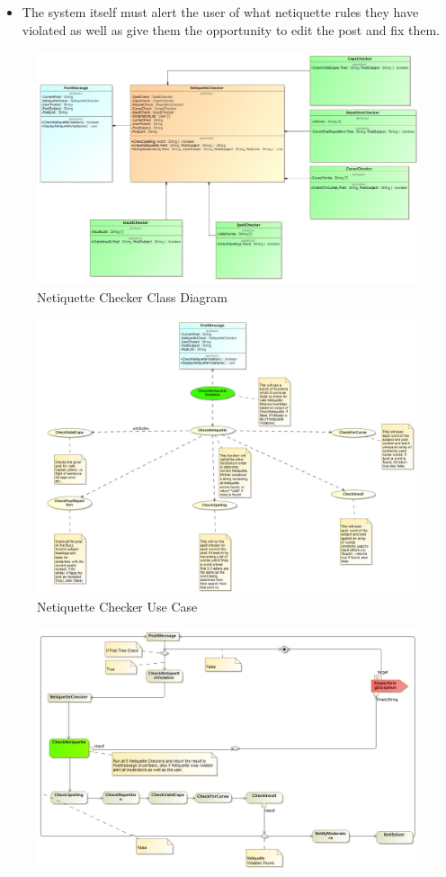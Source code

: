 \documentclass[11pt]{article}
\begin{document}
\begin{enumerate}
\begin{itemize}
\begin{itemize}
	  		\item The system itself must alert the user of what netiquette rules they have violated as well as give them the opportunity to edit the post and fix them.
	  	\end{itemize}
	  		\begin{figure}[H]
	  			\includegraphics[scale=0.35]{NetInputOutput.jpg}
	  			\caption{Netiquette Checker Class Diagram}
	  		\end{figure}
	  		\begin{figure}[H]
	  			\includegraphics[scale=0.35]{NetUseCase.jpg}
	  			\caption{Netiquette Checker Use Case}
	  		\end{figure}
	  		\begin{figure}[H]
	  			\includegraphics[scale=0.35]{NetProcessDiagram.jpg}

\end{figure}
\end{itemize}
\end{enumerate}
\end{document}
